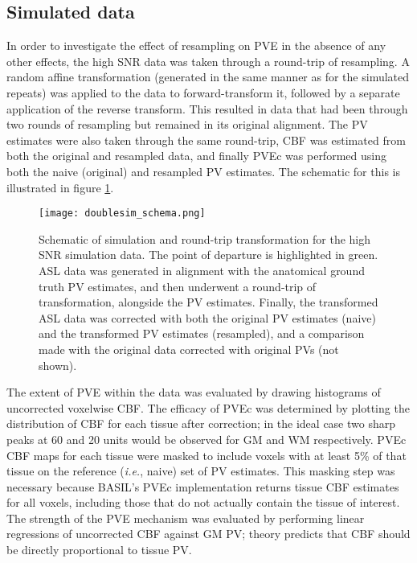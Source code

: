 \subsection{Simulated data}
\label{pvec_simulation_data_section}

In order to investigate the effect of resampling on PVE in the absence of any other effects, the high SNR data was taken through a round-trip of resampling. A random affine transformation (generated in the same manner as for the simulated repeats) was applied to the data to forward-transform it, followed by a separate application of the reverse transform. This resulted in data that had been through two rounds of resampling but remained in its original alignment. The PV estimates were also taken through the same round-trip, CBF was estimated from both the original and resampled data, and finally PVEc was performed using both the naive (original) and resampled PV estimates. The schematic for this is illustrated in figure \ref{doublesim_schema}. 

\begin{figure}[h]
\centering
\texttt{[image: doublesim\_schema.png]}
\caption{Schematic of simulation and round-trip transformation for the high SNR simulation data. The point of departure is highlighted in green. ASL data was generated in alignment with the anatomical ground truth PV estimates, and then underwent a round-trip of transformation, alongside the PV estimates. Finally, the transformed ASL data was corrected with both the original PV estimates (naive) and the transformed PV estimates (resampled), and a comparison made with the original data corrected with original PVs (not shown).}
\label{doublesim_schema}
\end{figure}

The extent of PVE within the data was evaluated by drawing histograms of uncorrected voxelwise CBF. The efficacy of PVEc was determined by plotting the distribution of CBF for each tissue after correction; in the ideal case two sharp peaks at 60 and 20 units would be observed for GM and WM respectively. PVEc CBF maps for each tissue were masked to include voxels with at least 5\% of that tissue on the reference (\textit{i.e.}, naive) set of PV estimates. This masking step was necessary because BASIL's PVEc implementation returns tissue CBF estimates for all voxels, including those that do not actually contain the tissue of interest. The strength of the PVE mechanism was evaluated by performing linear regressions of uncorrected CBF against GM PV; theory predicts that CBF should be directly proportional to tissue PV. 

